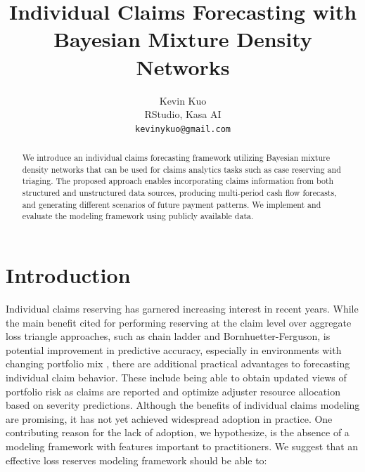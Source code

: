\documentclass{article}
\title{Individual Claims Forecasting with Bayesian Mixture Density Networks}
\author{
  Kevin Kuo \\
  RStudio, Kasa AI\\
  \texttt{kevinykuo@gmail.com} \\
}
\begin{document}
\maketitle

\begin{abstract}
We introduce an individual claims forecasting framework utilizing Bayesian mixture density networks that can be used for claims analytics tasks such as case reserving and triaging. The proposed approach enables incorporating claims information from both structured and unstructured data sources, producing multi-period cash flow forecasts, and generating different scenarios of future payment patterns. We implement and evaluate the modeling framework using publicly available data.
\end{abstract}



\section{Introduction}

Individual claims reserving has garnered increasing interest in recent years. While the main benefit cited for performing reserving at the claim level over aggregate loss triangle approaches, such as chain ladder and Bornhuetter-Ferguson, is potential improvement in predictive accuracy, especially in environments with changing portfolio mix \cite{boumezoued2017individual}, there are additional practical advantages to forecasting individual claim behavior. These include being able to obtain updated views of portfolio risk as claims are reported and optimize adjuster resource allocation based on severity predictions. Although the benefits of individual claims modeling are promising, it has not yet achieved widespread adoption in practice. One contributing reason for the lack of adoption, we hypothesize, is the absence of a modeling framework with features important to practitioners. We suggest that an effective loss reserves modeling framework should be able to:
\end{document}

